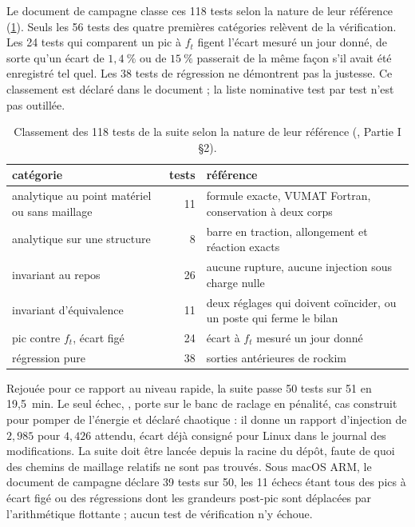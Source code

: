 Le document de campagne classe ces 118 tests selon la nature de leur référence (\cref{tab-classement}). Seuls les 56 tests des quatre premières catégories relèvent de la vérification. Les 24 tests qui comparent un pic à $f_t$ figent l'écart mesuré un jour donné, de sorte qu'un écart de $1{,}4~\%$ ou de $15~\%$ passerait de la même façon s'il avait été enregistré tel quel. Les 38 tests de régression ne démontrent pas la justesse. Ce classement est déclaré dans le document ; la liste nominative test par test n'est pas outillée.

\begin{table}[htbp]
\centering
\caption{Classement des 118 tests de la suite selon la nature de leur référence (, Partie I §2).}
\label{tab-classement}
\begin{tabularx}{\linewidth}{@{}X r X@{}}
\toprule
catégorie & tests & référence \\
\midrule
analytique au point matériel ou sans maillage & 11 & formule exacte, VUMAT Fortran, conservation à deux corps \\
analytique sur une structure & 8 & barre en traction, allongement et réaction exacts \\
invariant au repos & 26 & aucune rupture, aucune injection sous charge nulle \\
invariant d'équivalence & 11 & deux réglages qui doivent coïncider, ou un poste qui ferme le bilan \\
pic contre $f_t$, écart figé & 24 & écart à $f_t$ mesuré un jour donné \\
régression pure & 38 & sorties antérieures de rockim \\
\bottomrule
\end{tabularx}
\end{table}

Rejouée pour ce rapport au niveau rapide, la suite passe 50 tests sur 51 en 19,5~min. Le seul échec, , porte sur le banc de raclage en pénalité, cas construit pour pomper de l'énergie et déclaré chaotique : il donne un rapport d'injection de $2{,}985$ pour $4{,}426$ attendu, écart déjà consigné pour Linux dans le journal des modifications. La suite doit être lancée depuis la racine du dépôt, faute de quoi des chemins de maillage relatifs ne sont pas trouvés. Sous macOS ARM, le document de campagne déclare 39 tests sur 50, les 11 échecs étant tous des pics à écart figé ou des régressions dont les grandeurs post-pic sont déplacées par l'arithmétique flottante ; aucun test de vérification n'y échoue.

